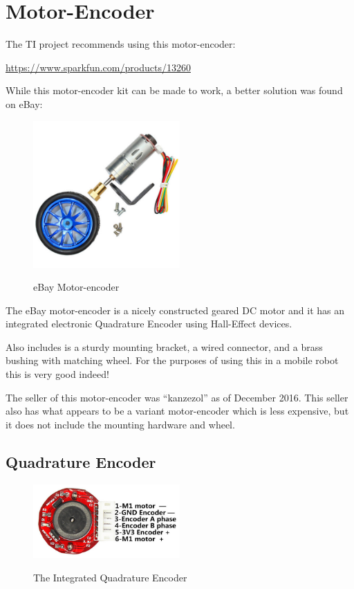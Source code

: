 \chapter{Motor-Encoder}

The TI project recommends using this motor-encoder:

\url{https://www.sparkfun.com/products/13260}

While this motor-encoder kit can be made to work, a better solution was found on eBay:

\begin{figure}[h]
	\centering
    \includegraphics[width=0.5\textwidth]{photos/s-l500.jpg}
	\centering\bfseries
	\caption{eBay Motor-encoder}
\end{figure}

The eBay motor-encoder is a nicely constructed geared DC motor and it has an integrated electronic Quadrature Encoder using Hall-Effect devices.

Also includes is a sturdy mounting bracket, a wired connector, and a brass bushing with matching wheel.  For the purposes of using this in a mobile robot this is very good indeed!

The seller of this motor-encoder was ``kanzezol'' as of December 2016.  This seller also has what appears to be a variant motor-encoder which is less expensive, but it does not include the mounting hardware and wheel.

\section{Quadrature Encoder}

\begin{figure}[h]
	\centering
    \includegraphics[width=0.5\textwidth]{photos/encoder-close-view.jpg}
	\centering\bfseries
	\caption{The Integrated Quadrature Encoder}
\end{figure}

